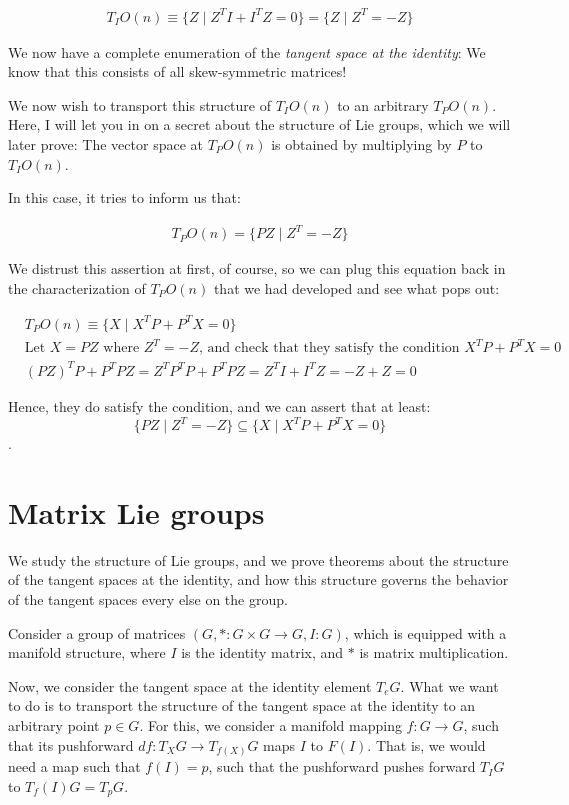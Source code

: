 \documentclass[11pt]{book}
\begin{document}
\begin{align*}
    T_I O(n) \equiv \{ Z \mid Z^T I + I^T Z = 0 \} = \{ Z \mid Z^T = -Z \}
 \end{align*}

 We now have a complete enumeration of the \textit{tangent space at the
 identity}: We know that this consists of all skew-symmetric matrices! 

 We now wish to transport this structure of $T_I O(n)$ to an arbitrary
 $T_P O(n)$.  Here, I will let you in on a secret about the structure of
 Lie groups, which we will later prove: The vector space at $T_P O(n)$ is obtained
 by multiplying by $P$ to $T_I O(n)$. 

 In this case, it tries to inform us that:

\begin{align*}
    T_P O(n) =  \{ PZ \mid Z^T = -Z \}
\end{align*}

We distrust this assertion at first, of course, so we can plug this equation back
in the characterization of $T_P O(n)$ that we had developed and see what pops out:

\begin{align*}
     &T_P O(n) \equiv \{ X \mid X^T P + P^T X = 0 \} \\
     &\text{Let $X = PZ$ where $Z^T = -Z$, and check that they satisfy the condition $X^T P + P^T X = 0$} \\
     & (PZ)^TP + P^TPZ = Z^TP^TP + P^TPZ = Z^T I + I^T Z = -Z + Z = 0
\end{align*}

Hence, they do satisfy the condition, and we can assert that at least:
$$\{ PZ \mid Z^T = -Z \} \subseteq  \{ X \mid X^T P + P^T X = 0 \}$$.

\chapter{Matrix Lie groups}

We study the structure of Lie groups, and we prove theorems about the
structure of the tangent spaces at the identity, and how this structure
governs the behavior of the tangent spaces every else on the group.

Consider a group of matrices $(G, *:G \times G \rightarrow G, I:G)$, which is equipped
with a manifold structure, where $I$ is the identity matrix, and $*$ is 
matrix multiplication.

Now, we consider the tangent space at the identity element $T_e G$. What
we want to do is to transport the structure of the tangent space at the identity
to an arbitrary point $p \in G$. For this, we consider a manifold mapping
$f: G \rightarrow G$, such that its pushforward $df: T_X G \rightarrow T_{f(X)} G$
maps $I$ to $F(I)$. That is, we would need a map such that $f(I) = p$, such that
the pushforward pushes forward $T_I G$ to $T_f(I) G = T_p G$.
\end{document}
